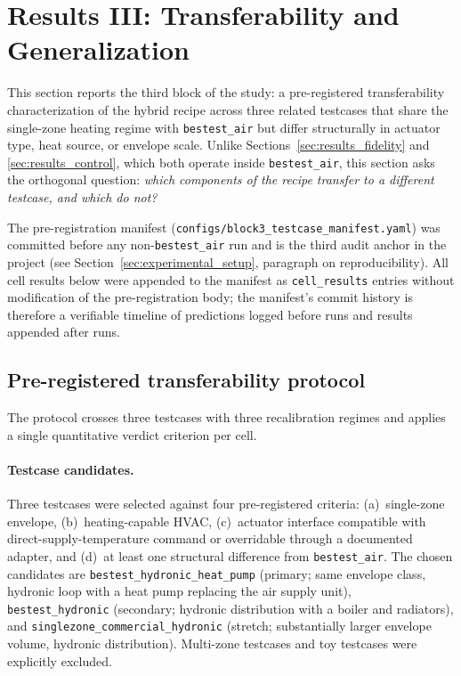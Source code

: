 \section{Results III: Transferability and Generalization}
\label{sec:results_transfer}

This section reports the third block of the study: a pre-registered
transferability characterization of the hybrid recipe across three related
\boptest{} testcases that share the single-zone heating regime with
\texttt{bestest\_air} but differ structurally in actuator type, heat source,
or envelope scale. Unlike Sections~\ref{sec:results_fidelity} and
\ref{sec:results_control}, which both operate inside \texttt{bestest\_air},
this section asks the orthogonal question: \emph{which components of the
recipe transfer to a different testcase, and which do not?}

The pre-registration manifest
(\texttt{configs/block3\_testcase\_manifest.yaml}) was committed before any
non-\texttt{bestest\_air} \boptest{} run and is the third audit anchor in the
project (see Section~\ref{sec:experimental_setup}, paragraph on
reproducibility). All cell results below were appended to the manifest as
\texttt{cell\_results} entries without modification of the pre-registration
body; the manifest's commit history is therefore a verifiable timeline of
predictions logged before runs and results appended after runs.

\subsection{Pre-registered transferability protocol}
\label{ssec:res3_protocol}

The protocol crosses three testcases with three recalibration regimes and
applies a single quantitative verdict criterion per cell.

\paragraph{Testcase candidates.}
Three \boptest{} testcases were selected against four pre-registered
criteria: (a)~single-zone envelope, (b)~heating-capable HVAC, (c)~actuator
interface compatible with direct-supply-temperature command or overridable
through a documented adapter, and (d)~at least one structural difference
from \texttt{bestest\_air}. The chosen candidates are
\texttt{bestest\_hydronic\_heat\_pump} (primary; same envelope class,
hydronic loop with a heat pump replacing the air supply unit),
\texttt{bestest\_hydronic} (secondary; hydronic distribution with a boiler
and radiators), and \texttt{singlezone\_commercial\_hydronic} (stretch;
substantially larger envelope volume, hydronic distribution). Multi-zone
testcases and toy \boptest{} testcases were explicitly excluded.

